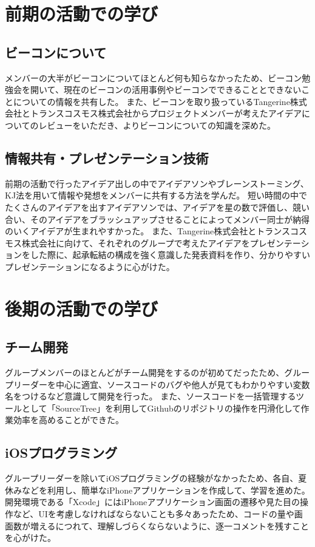 \documentclass[openany,11pt,papersize]{jsbook}
\begin{document}


\section{前期の活動での学び}
\subsection{ビーコンについて}
メンバーの大半がビーコンについてほとんど何も知らなかったため、ビーコン勉強会を開いて、現在のビーコンの活用事例やビーコンでできることとできないことについての情報を共有した。
また、ビーコンを取り扱っているTangerine株式会社とトランスコスモス株式会社からプロジェクトメンバーが考えたアイデアについてのレビューをいただき、よりビーコンについての知識を深めた。


\subsection{情報共有・プレゼンテーション技術}
前期の活動で行ったアイデア出しの中でアイデアソンやブレーンストーミング、KJ法を用いて情報や発想をメンバーに共有する方法を学んだ。
短い時間の中でたくさんのアイデアを出すアイデアソンでは、アイデアを星の数で評価し、競い合い、そのアイデアをブラッシュアップさせることによってメンバー同士が納得のいくアイデアが生まれやすかった。
また、Tangerine株式会社とトランスコスモス株式会社に向けて、それぞれのグループで考えたアイデアをプレゼンテーションをした際に、起承転結の構成を強く意識した発表資料を作り、分かりやすいプレゼンテーションになるように心がけた。


\section{後期の活動での学び}
\subsection{チーム開発}
グループメンバーのほとんどがチーム開発をするのが初めてだったため、グループリーダーを中心に適宜、ソースコードのバグや他人が見てもわかりやすい変数名をつけるなど意識して開発を行った。
また、ソースコードを一括管理するツールとして「SourceTree」を利用してGithubのリポジトリの操作を円滑化して作業効率を高めることができた。


\subsection{iOSプログラミング}
グループリーダーを除いてiOSプログラミングの経験がなかったため、各自、夏休みなどを利用し、簡単なiPhoneアプリケーションを作成して、学習を進めた。
開発環境である「Xcode」にはiPhoneアプリケーション画面の遷移や見た目の操作など、UIを考慮しなければならないことも多々あったため、コードの量や画面数が増えるにつれて、理解しづらくならないように、逐一コメントを残すことを心がけた。
\end{document}
